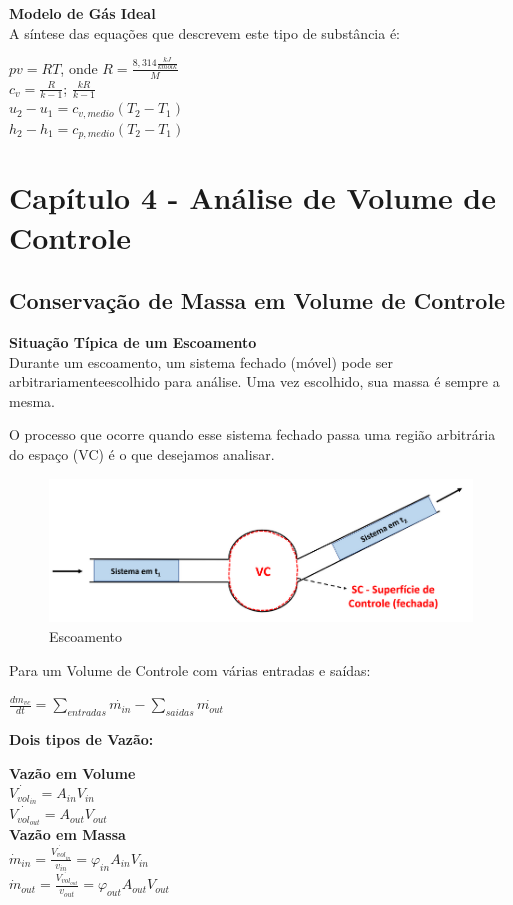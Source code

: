 \documentclass[a4paper, 12pt]{article}
\begin{document}
\textbf{Modelo de Gás Ideal}\\
A síntese das equações que descrevem este tipo de substância é:
	\begin{center}
		\large
		$ pv = RT $, onde $ R = \frac{8,314 \frac{kJ}{kmol k}}{M} $\\
		$ c_v = \frac{R}{k - 1} $; $ \frac{kR}{k - 1} $\\
		$ u_2 - u_1 = c_{v,medio}(T_2-T_1) $\\
		$ h_2-h_1 = c_{p,medio}(T_2-T_1) $
	\end{center}


\newpage
\section{Capítulo 4 - Análise de Volume de Controle}
\subsection{Conservação de Massa em Volume de Controle}
\textbf{Situação Típica de um Escoamento}\\
Durante um escoamento, um sistema fechado (móvel) pode ser arbitrariamenteescolhido para análise. Uma vez escolhido, sua massa é sempre a mesma.

O processo que ocorre quando esse sistema fechado passa uma região arbitrária
do espaço (VC) é o que desejamos analisar.
	\begin{figure}[h]
		\includegraphics[width = 12cm]{vcc.png}
		\centering
		\caption{Escoamento}
	\end{figure}
	
Para um Volume de Controle com várias entradas e saídas:
	\begin{center}
		\large
		$ \frac{dm_{vc}}{dt} = \sum\limits_{entradas}\dot{m_{in}} - \sum\limits_{saidas}\dot{m_{out}}$
	\end{center}

\textbf{Dois tipos de Vazão:}\\
	\begin{center}
		\large
		\textbf{Vazão em Volume}\\
		$ \dot{V_{vol_{in}}} = A_{in}V_{in} $\\
		$ \dot{V_{vol_{out}}} = A_{out}V_{out} $\\
		
		\textbf{Vazão em Massa}\\
		$ \dot{m}_{in} = \frac{\dot{V_{vol_{in}}}}{v_{in}} = \varphi_{in}A_{in}V_{in} $\\
		$ \dot{m}_{out} = \frac{\dot{V_{vol_{out}}}}{v_{out}} = \varphi_{out}A_{out}V_{out} $
	\end{center}
\end{document}
